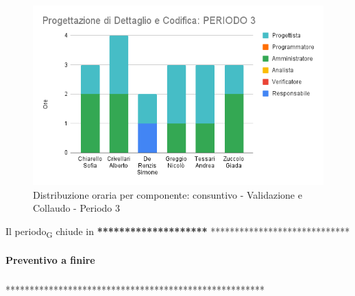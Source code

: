 \begin{figure}[H]
	\centering
	\includegraphics[scale=0.6]{res/images/charts/consuntivo/prog_dett_3.png}
	\caption{Distribuzione oraria per componente: consuntivo - Validazione e Collaudo - Periodo 3}
\end{figure}


Il periodo\textsubscript{G} chiude in \textbf{********************} *****************************


\paragraph{Preventivo a finire}
\subparagraph*{}

\pafTable{
	
}

******************************************************
